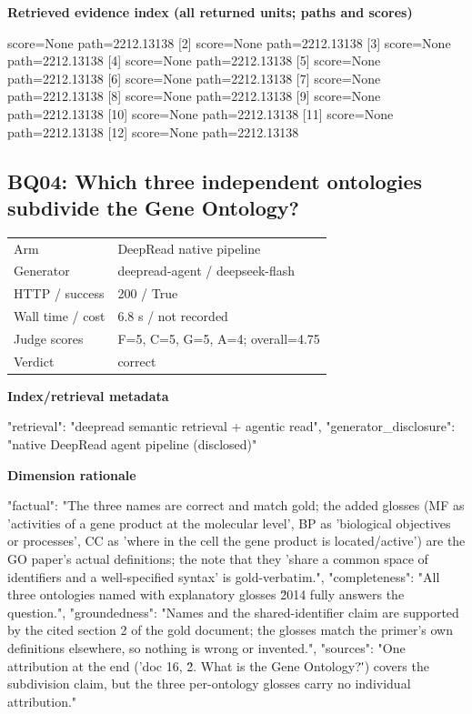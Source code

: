 \documentclass[10pt]{article}
\begin{document}
\textbf{Retrieved evidence index (all returned units; paths and scores) }
\begin{EvidenceText}
[1] score=None path=2212.13138
[2] score=None path=2212.13138
[3] score=None path=2212.13138
[4] score=None path=2212.13138
[5] score=None path=2212.13138
[6] score=None path=2212.13138
[7] score=None path=2212.13138
[8] score=None path=2212.13138
[9] score=None path=2212.13138
[10] score=None path=2212.13138
[11] score=None path=2212.13138
[12] score=None path=2212.13138
\end{EvidenceText}
\subsection{BQ04: Which three independent ontologies subdivide the Gene Ontology?}
\begin{tabular}{@{}ll@{}}
Arm & DeepRead native pipeline\\
Generator & deepread-agent / deepseek-flash\\
HTTP / success & 200 / True\\
Wall time / cost & 6.8 s / not recorded\\
Judge scores & F=5, C=5, G=5, A=4; overall=4.75\\
Verdict & correct\\
\end{tabular}

\textbf{Index/retrieval metadata}
\begin{EvidenceText}
{
  "retrieval": "deepread semantic retrieval + agentic read",
  "generator_disclosure": "native DeepRead agent pipeline (disclosed)"
}
\end{EvidenceText}

\textbf{Dimension rationale}
\begin{EvidenceText}
{
  "factual": "The three names are correct and match gold; the added glosses (MF as 'activities of a gene product at the molecular level', BP as 'biological objectives or processes', CC as 'where in the cell the gene product is located/active') are the GO paper's actual definitions; the note that they 'share a common space of identifiers and a well-specified syntax' is gold-verbatim.",
  "completeness": "All three ontologies named with explanatory glosses \u2014 fully answers the question.",
  "groundedness": "Names and the shared-identifier claim are supported by the cited section 2 of the gold document; the glosses match the primer's own definitions elsewhere, so nothing is wrong or invented.",
  "sources": "One attribution at the end ('doc 16, \"2. What is the Gene Ontology?\"') covers the subdivision claim, but the three per-ontology glosses carry no individual attribution."
}
\end{EvidenceText}
\end{document}
